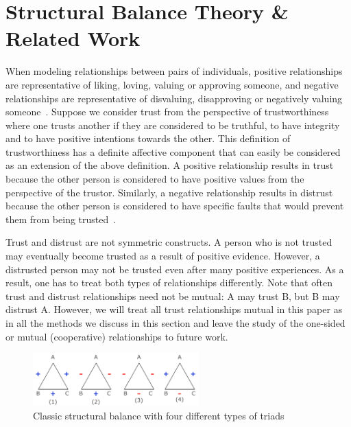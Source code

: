 

\section{Structural Balance Theory \& Related Work} 
When modeling relationships between pairs of individuals, positive
relationships are representative of liking, loving, valuing or
approving someone, and negative relationships are representative of
disvaluing, disapproving or negatively valuing
someone~\cite{Cartwright:56}. Suppose we consider trust from the
perspective of trustworthiness where one trusts another if they are
considered to be truthful, to have integrity and to have positive
intentions towards the other. This definition of trustworthiness has a
definite affective component that can easily be considered as an
extension of the above definition. A positive relationship results in
trust because the other person is considered to have positive values
from the perspective of the trustor. Similarly, a negative
relationship results in distrust because the other person is
considered to have specific faults that would prevent them from being
trusted~\cite{Adali:2013}.

Trust and distrust are not symmetric constructs. A person who is not
trusted may eventually become trusted as a result of positive
evidence. However, a distrusted person may not be trusted even after
many positive experiences. As a result, one has to treat both types of
relationships differently. Note that often trust and distrust
relationships need not be mutual: A may trust B, but B may distrust
A. However, we will treat all trust relationships mutual in this paper
as in all the methods we discuss in this section and leave the study
of the one-sided or mutual (cooperative) relationships to future work.

\begin{figure}[th]
\centering
\includegraphics[height=0.8in]{Figs/strongBalance_ver.pdf}
\vspace*{-0.1in}
\caption{\label{fig:balance_strong}Classic structural balance with four different types of triads}
\end{figure}

